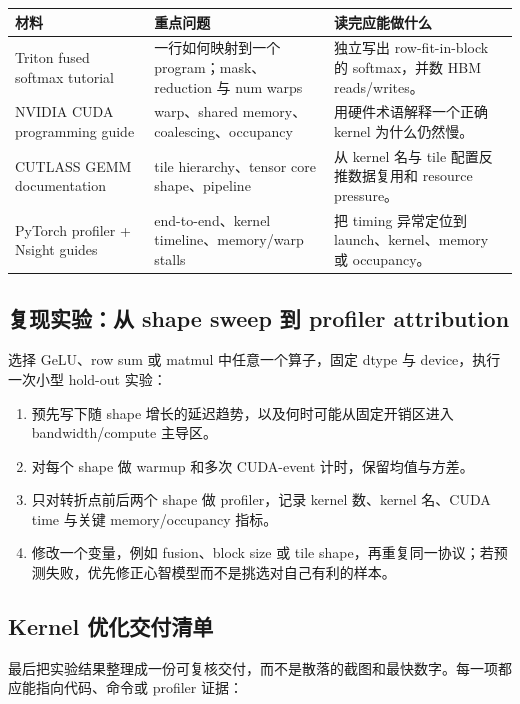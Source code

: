 \documentclass[a4paper]{article}
\begin{document}
\begin{longtable}{p{}p{}p{}}
\toprule
\textbf{材料} & \textbf{重点问题} & \textbf{读完应能做什么} \\
\midrule
Triton fused softmax tutorial & 一行如何映射到一个 program；mask、reduction 与 num warps & 独立写出 row-fit-in-block 的 softmax，并数 HBM reads/writes。 \\
NVIDIA CUDA programming guide & warp、shared memory、coalescing、occupancy & 用硬件术语解释一个正确 kernel 为什么仍然慢。 \\
CUTLASS GEMM documentation & tile hierarchy、tensor core shape、pipeline & 从 kernel 名与 tile 配置反推数据复用和 resource pressure。 \\
PyTorch profiler + Nsight guides & end-to-end、kernel timeline、memory/warp stalls & 把 timing 异常定位到 launch、kernel、memory 或 occupancy。 \\
\bottomrule
\end{longtable}

\subsection{复现实验：从 shape sweep 到 profiler attribution}

选择 GeLU、row sum 或 matmul 中任意一个算子，固定 dtype 与 device，执行一次小型 hold-out 实验：

\begin{enumerate}
    \item 预先写下随 shape 增长的延迟趋势，以及何时可能从固定开销区进入 bandwidth/compute 主导区。
    \item 对每个 shape 做 warmup 和多次 CUDA-event 计时，保留均值与方差。
    \item 只对转折点前后两个 shape 做 profiler，记录 kernel 数、kernel 名、CUDA time 与关键 memory/occupancy 指标。
    \item 修改一个变量，例如 fusion、block size 或 tile shape，再重复同一协议；若预测失败，优先修正心智模型而不是挑选对自己有利的样本。
\end{enumerate}

\subsection{Kernel 优化交付清单}

最后把实验结果整理成一份可复核交付，而不是散落的截图和最快数字。每一项都应能指向代码、命令或 profiler 证据：
\end{document}
